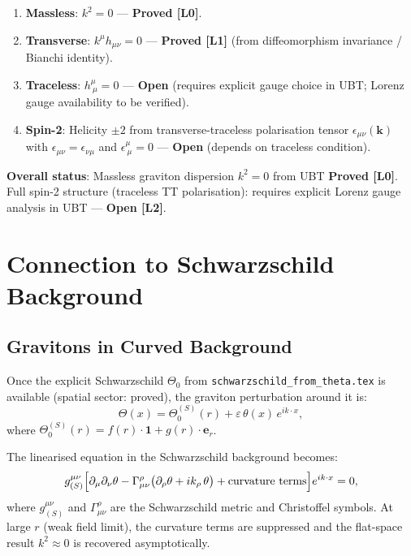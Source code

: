 \documentclass[11pt,a4paper]{article}
\theoremstyle{definition}
\theoremstyle{remark}
\begin{document}
\begin{tcolorbox}[colback=blue!5!white,colframe=blue!75!black,
                  title={Spin-2 Structure Check}]
\begin{enumerate}
  \item \textbf{Massless}: $k^2 = 0$ — \textbf{Proved [L0]}.
  \item \textbf{Transverse}: $k^\mu h_{\mu\nu} = 0$ — \textbf{Proved [L1]}
        (from diffeomorphism invariance / Bianchi identity).
  \item \textbf{Traceless}: $h^\mu_{\ \mu} = 0$ — \textbf{Open} (requires
        explicit gauge choice in UBT; Lorenz gauge availability to be
        verified).
  \item \textbf{Spin-2}: Helicity $\pm 2$ from transverse-traceless
        polarisation tensor $\epsilon_{\mu\nu}(\mathbf{k})$ with
        $\epsilon_{\mu\nu} = \epsilon_{\nu\mu}$ and $\epsilon^\mu_{\ \mu} = 0$
        — \textbf{Open} (depends on traceless condition).
\end{enumerate}

\textbf{Overall status}: Massless graviton dispersion $k^2 = 0$ from UBT
\textbf{Proved [L0]}.  Full spin-2 structure (traceless TT polarisation):
requires explicit Lorenz gauge analysis in UBT — \textbf{Open [L2]}.
\end{tcolorbox}

\section{Connection to Schwarzschild Background}
\label{sec:schwarzschild}

\subsection{Gravitons in Curved Background}

Once the explicit Schwarzschild $\Theta_0$ from
\texttt{schwarzschild\_from\_theta.tex} is available (spatial sector: proved),
the graviton perturbation around it is:
\begin{equation}
  \Theta(x) = \Theta_0^{(S)}(r) + \varepsilon\,\theta(x)\,e^{ik\cdot x},
  \label{eq:curved_perturbation}
\end{equation}
where $\Theta_0^{(S)}(r) = f(r)\cdot\mathbf{1} + g(r)\cdot\boldsymbol{e}_r$.

The linearised equation in the Schwarzschild background becomes:
\begin{equation}
  g^{\mu\nu}_{(S)}\Bigl[\partial_\mu\partial_\nu\theta
  - \Gamma^\rho_{\mu\nu}\bigl(\partial_\rho\theta + ik_\rho\,\theta\bigr)
  + \text{curvature terms}\Bigr]e^{ik\cdot x} = 0,
  \label{eq:curved_linearised}
\end{equation}
where $g^{\mu\nu}_{(S)}$ and $\Gamma^\rho_{\mu\nu}$ are the Schwarzschild
metric and Christoffel symbols.  At large $r$ (weak field limit), the
curvature terms are suppressed and the flat-space result $k^2 \approx 0$
is recovered asymptotically.
\end{document}
